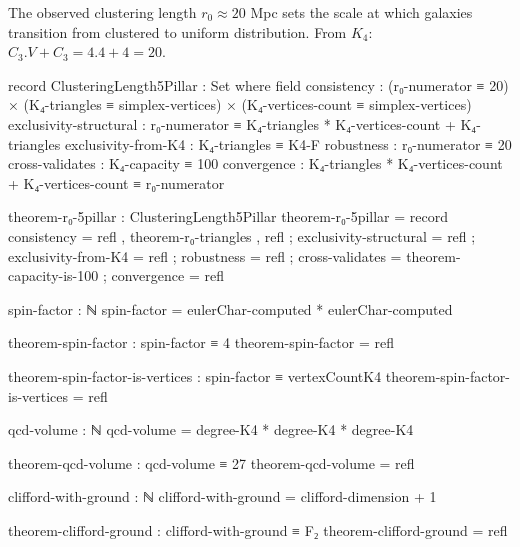 \documentclass[11pt,a4paper]{book}
\def\cdot{.}%
\begin{document}
The observed clustering length $r_0 \approx 20$ Mpc sets the scale at which galaxies transition from clustered to uniform distribution. From $K_4$: $C_3 \cdot V + C_3 = 4 \cdot 4 + 4 = 20$.

\begin{code}
record ClusteringLength5Pillar : Set where
  field
    consistency            : (r₀-numerator ≡ 20) × (K₄-triangles ≡ simplex-vertices) × (K₄-vertices-count ≡ simplex-vertices)
    exclusivity-structural : r₀-numerator ≡ K₄-triangles * K₄-vertices-count + K₄-triangles
    exclusivity-from-K4    : K₄-triangles ≡ K4-F
    robustness             : r₀-numerator ≡ 20
    cross-validates        : K₄-capacity ≡ 100
    convergence            : K₄-triangles * K₄-vertices-count + K₄-vertices-count ≡ r₀-numerator

theorem-r₀-5pillar : ClusteringLength5Pillar
theorem-r₀-5pillar = record
  { consistency            = refl , theorem-r₀-triangles , refl
  ; exclusivity-structural = refl
  ; exclusivity-from-K4    = refl
  ; robustness             = refl
  ; cross-validates        = theorem-capacity-is-100
  ; convergence            = refl
  }
\end{code}

\begin{code}
spin-factor : ℕ
spin-factor = eulerChar-computed * eulerChar-computed

theorem-spin-factor : spin-factor ≡ 4
theorem-spin-factor = refl

theorem-spin-factor-is-vertices : spin-factor ≡ vertexCountK4
theorem-spin-factor-is-vertices = refl

qcd-volume : ℕ
qcd-volume = degree-K4 * degree-K4 * degree-K4

theorem-qcd-volume : qcd-volume ≡ 27
theorem-qcd-volume = refl

clifford-with-ground : ℕ
clifford-with-ground = clifford-dimension + 1

theorem-clifford-ground : clifford-with-ground ≡ F₂
theorem-clifford-ground = refl
\end{code}
\end{document}
